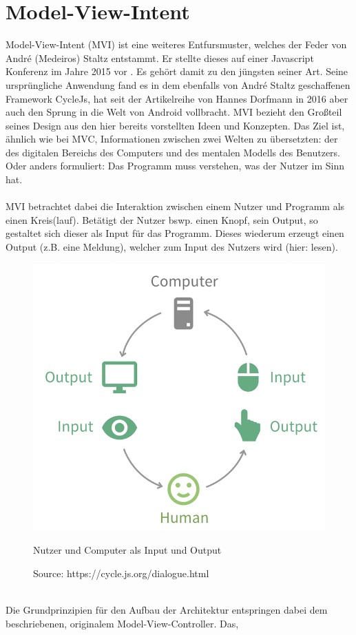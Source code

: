\section{Model-View-Intent}
\label{sec:model-view-intent}
Model-View-Intent (MVI) ist eine weiteres Entfursmuster, welches der Feder von André (Medeiros) Staltz entstammt. Er stellte dieses auf einer Javascript Konferenz im Jahre 2015 vor
\cite{modelViewIntentIntroduction}. Es gehört damit zu den jüngsten seiner Art.
Seine ursprüngliche Anwendung fand es in dem ebenfalls von André Staltz geschaffenen Framework CycleJs, hat seit der Artikelreihe von Hannes Dorfmann in 2016
\cite{modelViewIntentOnAndroidHannesDorfmann2016}
aber auch den Sprung in die Welt von Android vollbracht. MVI bezieht den Großteil seines Design aus den hier bereits vorstellten Ideen und Konzepten. Das Ziel ist, ähnlich wie bei MVC, Informationen zwischen zwei Welten zu übersetzten: der des digitalen Bereichs des Computers und des mentalen Modells des Benutzers. Oder anders formuliert: Das Programm muss verstehen, was der Nutzer im Sinn hat.
\\
\\
MVI betrachtet dabei die Interaktion zwischen einem Nutzer und Programm als einen Kreis(lauf). Betätigt der Nutzer bswp. einen Knopf, sein Output, so gestaltet sich dieser als Input für das Programm. Dieses wiederum erzeugt einen Output (z.B. eine Meldung), welcher zum Input des Nutzers wird (hier: lesen).
\begin{figure}[ht]
	\centering
	\includegraphics[height=0.5\textwidth]{./images/mvi-cycle}
	\caption{Nutzer und Computer als Input und Output}
	\caption*{Source: https://cycle.js.org/dialogue.html}
	\label{fig:userComputerInputOutput}
\end{figure}
\\
Die Grundprinzipien für den Aufbau der Architektur entspringen dabei dem beschriebenen, originalem Model-View-Controller. Das,
